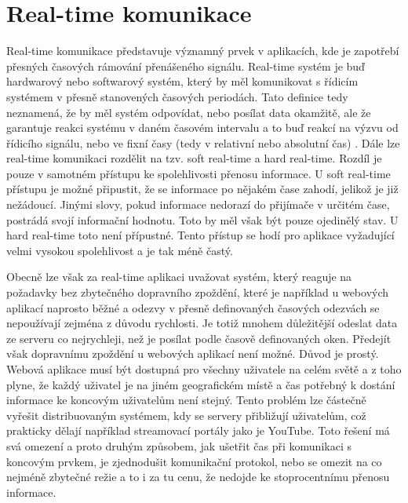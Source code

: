\chapter{Real-time komunikace}
Real-time  komunikace představuje významný prvek v aplikacích, kde je zapotřebí přesných časových rámování přenášeného signálu. Real-time systém je buď hardwarový nebo softwarový systém, který by měl komunikovat s řídicím systémem v přesně stanovených časových periodách. Tato definice tedy neznamená, že by měl systém odpovídat, nebo posílat data okamžitě, ale že garantuje reakci systému v daném časovém intervalu a to buď reakcí na výzvu od řídicího signálu, nebo ve fixní časy (tedy v relativní nebo absolutní čas) \cite{real-time}. Dále lze real-time komunikaci rozdělit na tzv. soft real-time a hard real-time. Rozdíl je pouze v samotném přístupu ke spolehlivosti přenosu informace. U soft real-time přístupu je možné připustit, že se informace po nějakém čase zahodí, jelikož je již nežádoucí. Jinými slovy, pokud informace nedorazí do přijímače v určitém čase, postrádá svojí informační hodnotu. Toto by měl však být pouze ojedinělý stav. U hard real-time toto není přípustné. Tento přístup se hodí pro aplikace vyžadující velmi vysokou spolehlivost a je tak méně častý.

Obecně lze však za real-time aplikaci uvažovat systém, který reaguje na požadavky bez zbytečného dopravního zpoždění, které je například u webových aplikací naprosto běžné a odezvy v přesně definovaných časových odezvách se nepoužívají zejména z důvodu rychlosti. Je totiž mnohem dů\-le\-ži\-těj\-ší odeslat data ze serveru co nejrychleji, než je posílat podle časově definovaných oken. Předejít však dopravnímu zpoždění u webových aplikací není možné. Důvod je prostý. Webová aplikace musí být dostupná pro všechny uživatele na celém světě a z toho plyne, že každý uživatel je na jiném geografickém místě a čas potřebný k dostání informace ke koncovým uživatelům není stejný. Tento problém lze částečně vyřešit distribuovaným systémem, kdy se servery přibližují uživatelům, což prakticky dělají například streamovací portály jako je YouTube. Toto řešení má svá omezení a proto druhým způsobem, jak ušetřit čas při komunikaci s koncovým prvkem, je zjednodušit komunikační protokol, nebo se omezit na co nejméně zbytečné režie a to i za tu cenu, že nedojde ke stoprocentnímu přenosu informace.

